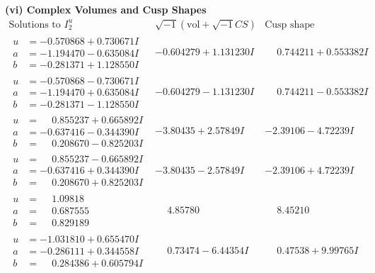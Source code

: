 \documentclass[1p]{elsarticle_modified}
\theoremstyle{definition}
\newcommand{\I}{\sqrt{-1}}
\begin{document}
\newpage\flushleft \textbf{(vi) Complex Volumes and Cusp Shapes}
$$\begin{array}{c|c|c}  
\text{Solutions to }I^u_{2}& \I (\text{vol} + \sqrt{-1}CS) & \text{Cusp shape}\\
 \hline 
\begin{aligned}
u &= -0.570868 + 0.730671 I \\
a &= -1.194470 - 0.635084 I \\
b &= -0.281371 + 1.128550 I\end{aligned}
 & -0.604279 + 1.131230 I & \phantom{-}0.744211 + 0.553382 I \\ \hline\begin{aligned}
u &= -0.570868 - 0.730671 I \\
a &= -1.194470 + 0.635084 I \\
b &= -0.281371 - 1.128550 I\end{aligned}
 & -0.604279 - 1.131230 I & \phantom{-}0.744211 - 0.553382 I \\ \hline\begin{aligned}
u &= \phantom{-}0.855237 + 0.665892 I \\
a &= -0.637416 - 0.344390 I \\
b &= \phantom{-}0.208670 - 0.825203 I\end{aligned}
 & -3.80435 + 2.57849 I & -2.39106 - 4.72239 I \\ \hline\begin{aligned}
u &= \phantom{-}0.855237 - 0.665892 I \\
a &= -0.637416 + 0.344390 I \\
b &= \phantom{-}0.208670 + 0.825203 I\end{aligned}
 & -3.80435 - 2.57849 I & -2.39106 + 4.72239 I \\ \hline\begin{aligned}
u &= \phantom{-}1.09818\phantom{ +0.000000I} \\
a &= \phantom{-}0.687555\phantom{ +0.000000I} \\
b &= \phantom{-}0.829189\phantom{ +0.000000I}\end{aligned}
 & \phantom{-}4.85780\phantom{ +0.000000I} & \phantom{-}8.45210\phantom{ +0.000000I} \\ \hline\begin{aligned}
u &= -1.031810 + 0.655470 I \\
a &= -0.286111 + 0.344558 I \\
b &= \phantom{-}0.284386 + 0.605794 I\end{aligned}
 & \phantom{-}0.73474 - 6.44354 I & \phantom{-}0.47538 + 9.99765 I \\ \hline\begin{aligned}

\end{aligned}
\end{array}$$
\end{document}
